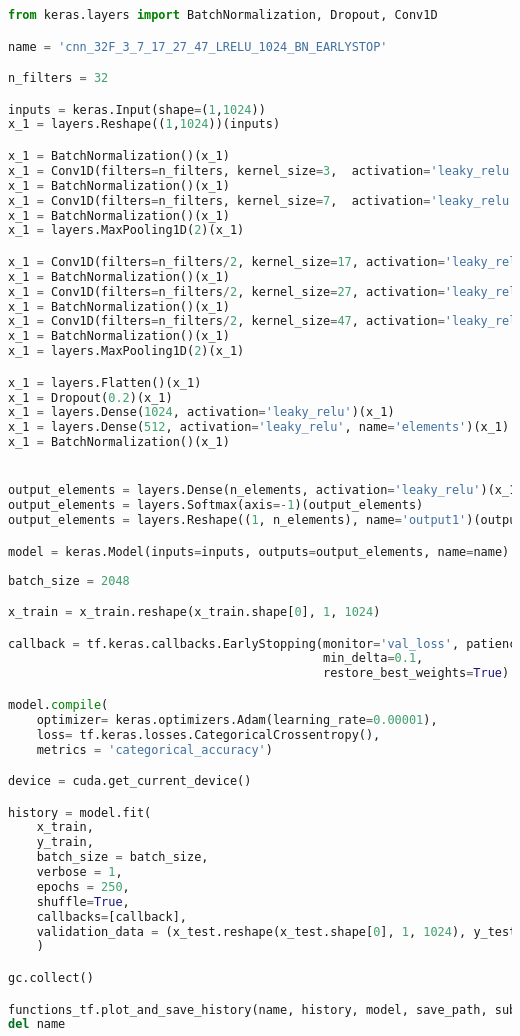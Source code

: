 \begin{lstlisting}[language=Python]
from keras.layers import BatchNormalization, Dropout, Conv1D

name = 'cnn_32F_3_7_17_27_47_LRELU_1024_BN_EARLYSTOP'

n_filters = 32

inputs = keras.Input(shape=(1,1024))
x_1 = layers.Reshape((1,1024))(inputs)

x_1 = BatchNormalization()(x_1)
x_1 = Conv1D(filters=n_filters, kernel_size=3,  activation='leaky_relu', data_format='channels_first')(x_1)
x_1 = BatchNormalization()(x_1)
x_1 = Conv1D(filters=n_filters, kernel_size=7,  activation='leaky_relu', data_format='channels_first')(x_1)
x_1 = BatchNormalization()(x_1)
x_1 = layers.MaxPooling1D(2)(x_1)

x_1 = Conv1D(filters=n_filters/2, kernel_size=17, activation='leaky_relu', data_format='channels_first')(x_1)
x_1 = BatchNormalization()(x_1)
x_1 = Conv1D(filters=n_filters/2, kernel_size=27, activation='leaky_relu', data_format='channels_first')(x_1)
x_1 = BatchNormalization()(x_1)
x_1 = Conv1D(filters=n_filters/2, kernel_size=47, activation='leaky_relu', data_format='channels_first')(x_1)
x_1 = BatchNormalization()(x_1)
x_1 = layers.MaxPooling1D(2)(x_1)

x_1 = layers.Flatten()(x_1)
x_1 = Dropout(0.2)(x_1)
x_1 = layers.Dense(1024, activation='leaky_relu')(x_1)
x_1 = layers.Dense(512, activation='leaky_relu', name='elements')(x_1)
x_1 = BatchNormalization()(x_1)


output_elements = layers.Dense(n_elements, activation='leaky_relu')(x_1)
output_elements = layers.Softmax(axis=-1)(output_elements)
output_elements = layers.Reshape((1, n_elements), name='output1')(output_elements)

model = keras.Model(inputs=inputs, outputs=output_elements, name=name)
\end{lstlisting}

\begin{lstlisting}[language=Python]
batch_size = 2048

x_train = x_train.reshape(x_train.shape[0], 1, 1024)

callback = tf.keras.callbacks.EarlyStopping(monitor='val_loss', patience=7,
                                            min_delta=0.1,
                                            restore_best_weights=True)

model.compile(
    optimizer= keras.optimizers.Adam(learning_rate=0.00001),
    loss= tf.keras.losses.CategoricalCrossentropy(),
    metrics = 'categorical_accuracy')

device = cuda.get_current_device()

history = model.fit(
    x_train,
    y_train,
    batch_size = batch_size,
    verbose = 1,
    epochs = 250,
    shuffle=True,
    callbacks=[callback],
    validation_data = (x_test.reshape(x_test.shape[0], 1, 1024), y_test)
    )

gc.collect()

functions_tf.plot_and_save_history(name, history, model, save_path, subfolder='CNN')
del name
\end{lstlisting}

